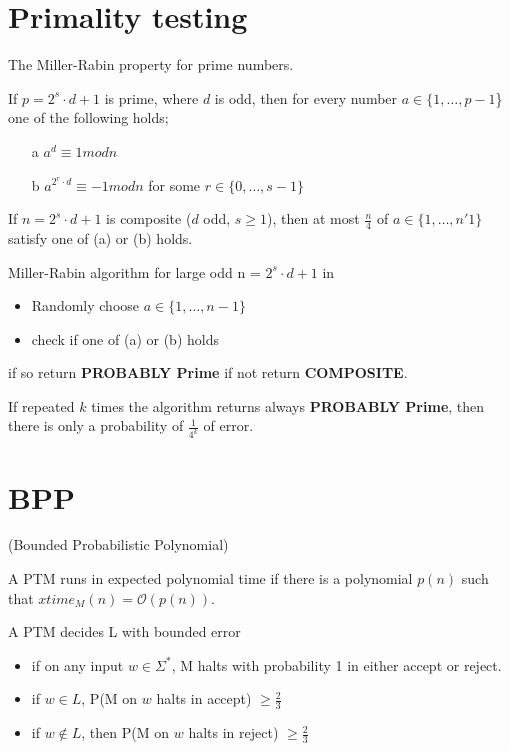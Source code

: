 \documentclass[a4paper,12pt]{article}
\theoremstyle{definition}
\theoremstyle{remark}
\begin{document}
\section{Primality testing}
The Miller-Rabin property for prime numbers.

If $p = 2^s \cdot d + 1$ is prime, where $d$ is odd, then for every number $a \in \{1, \dots, p-1$\} one of the following holds;
\begin{itemize}
    \item[a] $a^d \equiv 1 mod n$
    \item[b] $a^{2^r \cdot d} \equiv -1 mod n$ for some $r \in \{0, \dots, s-1\}$
\end{itemize}

If $n = 2^s \cdot d + 1$ is composite ($d$ odd, $s \geq 1$), then at most $\frac{n}{4}$ of $a \in \{1, \dots, n'1\}$ satisfy one of (a) or (b) holds.

Miller-Rabin algorithm for large odd n = $2^s \cdot d + 1$ in
\begin{itemize}
    \item Randomly choose $a \in \{1, \dots, n-1\}$
    \item check if one of (a) or (b) holds
\end{itemize}

if so return \textbf{PROBABLY Prime} if not return \textbf{COMPOSITE}.

If repeated $k$ times the algorithm returns always \textbf{PROBABLY Prime}, then there is only a probability of $\frac{1}{4^k}$ of error.


\section{BPP}

(Bounded Probabilistic Polynomial)

A PTM runs in expected polynomial time if there is a polynomial $p(n)$ such that $xtime_M(n) = \mathscr{O}(p(n))$.

A PTM decides L with bounded error
\begin{itemize}
    \item if on any input $w \in \Sigma^*$, M halts with probability 1 in either accept or reject.
    \item if $w \in L$, P(M on $w$ halts in accept) $\geq \frac{2}{3}$
    \item if $w \notin L$, then P(M on $w$ halts in reject) $\geq \frac{2}{3}$
\end{itemize}
\end{document}

